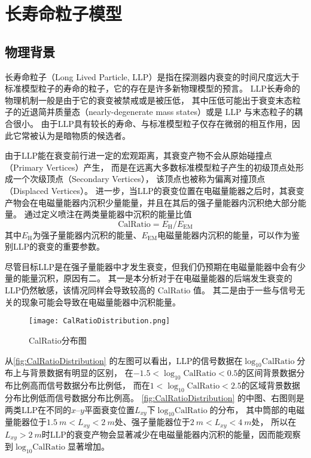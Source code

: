 
\chapter{长寿命粒子模型}

\section{物理背景}
长寿命粒子（Long Lived Particle, LLP）是指在探测器内衰变的时间尺度远大于标准模型粒子的寿命的粒子，它的存在是许多新物理模型的预言。
LLP长寿命的物理机制一般是由于它的衰变被禁戒或是被压低，
其中压低可能出于衰变末态粒子的近退简并质量态（nearly-degenerate mass states）或是 LLP 与末态粒子的耦合很小。
由于LLP具有较长的寿命、与标准模型粒子仅存在微弱的相互作用，因此它常被认为是暗物质的候选者。

由于LLP能在衰变前行进一定的宏观距离，其衰变产物不会从原始碰撞点（Primary Vertices）产生，
而是在远离大多数标准模型粒子产生的初级顶点处形成一个次级顶点（Secondary Vertices），
该顶点也被称为偏离对撞顶点（Displaced Vertices）。
进一步，当LLP的衰变位置在电磁量能器之后时，其衰变产物会在电磁量能器内沉积少量能量，并且在其后的强子量能器内沉积绝大部分能量。
通过定义喷注在两类量能器中沉积的能量比值$$\text{CalRatio}=E_{\text{H}}/E_{\text{EM}}$$
其中$E_{\text{H}}$为强子量能器内沉积的能量、$E_{\text{EM}}$电磁量能器内沉积的能量，可以作为鉴别LLP的衰变的重要参数。
\cite{calratio}

尽管目标LLP是在强子量能器中才发生衰变，但我们仍预期在电磁量能器中会有少量的能量沉积，原因有二。
其一是本分析对于在电磁量能器的后端发生衰变的LLP仍然敏感，该情况同样会导致较高的 CalRatio 值。
其二是由于一些与信号无关的现象可能会导致在电磁量能器中沉积能量。

\begin{figure}[ht]
    \centering
    \texttt{[image: CalRatioDistribution.png]}
    \caption{CalRatio分布图\cite{ATLAS:2022zhj}}
    \label{fig:CalRatioDistribution}
\end{figure}

从\autoref{fig:CalRatioDistribution} 的左图可以看出，LLP的信号数据在$\log_{10}\text{CalRatio}$分布上与背景数据有明显的区别，
在$-1.5<\log_{10}\text{CalRatio}<0.5$的区间背景数据分布比例高而信号数据分布比例低，
而在$1<\log_{10}\text{CalRatio}<2.5$的区域背景数据分布比例低而信号数据分布比例高。
\autoref{fig:CalRatioDistribution} 的中图、右图则是两类LLP在不同的$x$--$y$平面衰变位置$L_{xy}$下$\log_{10}\text{CalRatio}$的分布，
其中筒部的电磁量能器位于$\SI{1.5}{m} < L_{xy} < \SI{2}{m}$处、强子量能器位于$\SI{2}{m} < L_{xy} < \SI{4}{m}$处，
所以在$L_{xy} > \SI{2}{m}$时LLP的衰变产物会显著减少在电磁量能器内沉积的能量，因而能观察到$\log_{10}\text{CalRatio}$显著增加。

